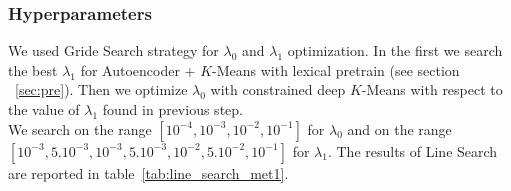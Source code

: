 \subsubsection{Hyperparameters}
We used Gride Search strategy for $\lambda_0$ and $\lambda_1$ optimization.
In the first we search the best $\lambda_1$ for Autoencoder + $K$-Means with lexical
pretrain (see section ~\ref{sec:pre}). Then we optimize $\lambda_0$ with constrained 
deep $K$-Means with respect to the value of $\lambda_1$ found in previous step.
\\We search on the range 
$[10^{-4},10^{-3},10^{-2},10^{-1}]$ for $\lambda_0$ and on the range
\\$[10^{-3},5.10^{-3},10^{-3},5.10^{-3},10^{-2},5.10^{-2},10^{-1}]$ 
for $\lambda_1$.   
The results of Line Search are reported in table~\ref{tab:line_search_met1}.
\begin{table}
\caption{\label{tab:line_search_met1}Best results of Line Search for the optimization of
hyperparameters for each dataset for the Unclustered Keywords method.}
\centering
{}
\end{table}
